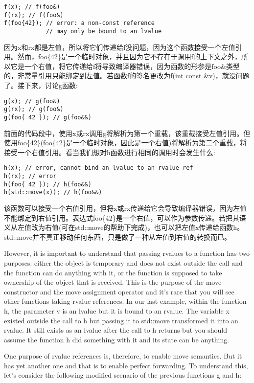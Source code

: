 \begin{lstlisting}[style=styleCXX]
f(x); // f(foo&)
f(rx); // f(foo&)
f(foo{42}); // error: a non-const reference
            // may only be bound to an lvalue
\end{lstlisting}

因为x和rx都是左值，所以将它们传递给f没问题，因为这个函数接受一个左值引用。然而，foo\{42\}是一个临时对象，并且因为它不存在于调用f的上下文之外，所以它是一个右值，将它传递给f将导致编译器错误，因为函数的形参是foo\&类型的，非常量引用只能绑定到左值。若函数f的签名更改为f(int const \&v)，就没问题了。接下来，讨论g函数:

\begin{lstlisting}[style=styleCXX]
g(x); // g(foo&)
g(rx); // g(foo&)
g(foo{ 42 }); // g(foo&&)
\end{lstlisting}

前面的代码段中，使用x或rx调用g将解析为第一个重载，该重载接受左值引用。但使用foo\{42\}(foo\{42\}是一个临时对象，因此是一个右值)将解析为第二个重载，将接受一个右值引用。看当我们想对h函数进行相同的调用时会发生什么:

\begin{lstlisting}[style=styleCXX]
h(x); // error, cannot bind an lvalue to an rvalue ref
h(rx); // error
h(foo{ 42 }); // h(foo&&)
h(std::move(x)); // h(foo&&)
\end{lstlisting}

该函数可以接受一个右值引用，但将x或rx传递给它会导致编译器错误，因为左值不能绑定到右值引用。表达式foo\{42\}是一个右值，可以作为参数传递。若把其语义从左值改为右值(可在std::move的帮助下完成)，也可以把左值x传递给函数h。std::move并不真正移动任何东西，只是做了一种从左值到右值的转换而已。

However, it is important to understand that passing rvalues to a function has two purposes: either the object is temporary and does not exist outside the call and the function can do anything with it, or the function is supposed to take ownership of the object that is received. This is the purpose of the move constructor and the move assignment operator and it’s rare that you will see other functions taking rvalue references. In our last example, within the function h, the parameter v is an lvalue but it is bound to an rvalue. The variable x existed outside the call to h but passing it to std::move transformed it into an rvalue. It still exists as an lvalue after the call to h returns but you should assume the function h did something with it and its state can be anything.

One purpose of rvalue references is, therefore, to enable move semantics. But it has yet another one and that is to enable perfect forwarding. To understand this, let’s consider the following modified scenario of the previous functions g and h:

